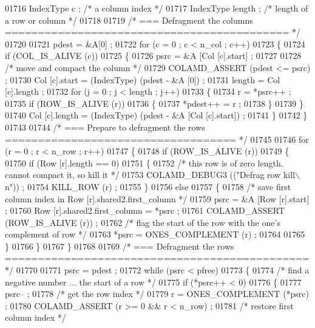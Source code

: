 \begin{DoxyCode}
{{{{{{{{{{{{{{{{{{{{{{{{{{{{01716   IndexType c ;     \textcolor{comment}{/* a column index */}
01717   IndexType length ;    \textcolor{comment}{/* length of a row or column */}
01718 
01719   \textcolor{comment}{/* === Defragment the columns =========================================== */}
01720 
01721   pdest = &A[0] ;
01722   \textcolor{keywordflow}{for} (c = 0 ; c < n\_col ; c++)
01723   \{
01724     \textcolor{keywordflow}{if} (COL\_IS\_ALIVE (c))
01725     \{
01726       psrc = &A [Col [c].start] ;
01727 
01728       \textcolor{comment}{/* move and compact the column */}
01729       COLAMD\_ASSERT (pdest <= psrc) ;
01730       Col [c].start = (IndexType) (pdest - &A [0]) ;
01731       length = Col [c].length ;
01732       \textcolor{keywordflow}{for} (j = 0 ; j < length ; j++)
01733       \{
01734     r = *psrc++ ;
01735     \textcolor{keywordflow}{if} (ROW\_IS\_ALIVE (r))
01736     \{
01737       *pdest++ = r ;
01738     \}
01739       \}
01740       Col [c].length = (IndexType) (pdest - &A [Col [c].start]) ;
01741     \}
01742   \}
01743 
01744   \textcolor{comment}{/* === Prepare to defragment the rows =================================== */}
01745 
01746   \textcolor{keywordflow}{for} (r = 0 ; r < n\_row ; r++)
01747   \{
01748     \textcolor{keywordflow}{if} (ROW\_IS\_ALIVE (r))
01749     \{
01750       \textcolor{keywordflow}{if} (Row [r].length == 0)
01751       \{
01752     \textcolor{comment}{/* this row is of zero length.  cannot compact it, so kill it */}
01753     COLAMD\_DEBUG3 ((\textcolor{stringliteral}{"Defrag row kill\(\backslash\)n"})) ;
01754     KILL\_ROW (r) ;
01755       \}
01756       \textcolor{keywordflow}{else}
01757       \{
01758     \textcolor{comment}{/* save first column index in Row [r].shared2.first\_column */}
01759     psrc = &A [Row [r].start] ;
01760     Row [r].shared2.first\_column = *psrc ;
01761     COLAMD\_ASSERT (ROW\_IS\_ALIVE (r)) ;
01762     \textcolor{comment}{/* flag the start of the row with the one's complement of row */}
01763     *psrc = ONES\_COMPLEMENT (r) ;
01764 
01765       \}
01766     \}
01767   \}
01768 
01769   \textcolor{comment}{/* === Defragment the rows ============================================== */}
01770 
01771   psrc = pdest ;
01772   \textcolor{keywordflow}{while} (psrc < pfree)
01773   \{
01774     \textcolor{comment}{/* find a negative number ... the start of a row */}
01775     \textcolor{keywordflow}{if} (*psrc++ < 0)
01776     \{
01777       psrc-- ;
01778       \textcolor{comment}{/* get the row index */}
01779       r = ONES\_COMPLEMENT (*psrc) ;
01780       COLAMD\_ASSERT (r >= 0 && r < n\_row) ;
01781       \textcolor{comment}{/* restore first column index */}
}}}}}}}}}}}}}}}}}}}}}}}}}}}}
\end{DoxyCode}
